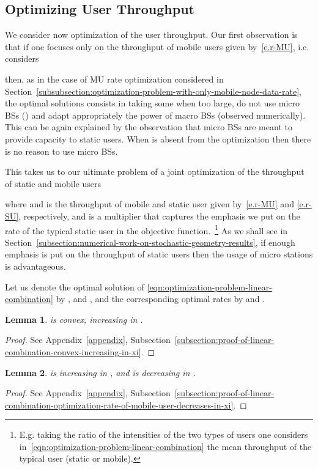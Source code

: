 \documentclass[10pt,journal]{IEEEtran}
\newtheorem{lemma}{Lemma}
\begin{document}
\subsection{Optimizing User Throughput}
\label{subsection:incorporating-data-rate-of-static-users-in-optimization}
We consider now optimization of the user throughput.
Our first observation is that if one focuses only on the throughput of
mobile users  given by~\eqref{e.r-MU}, i.e. considers 

then, as in the case of MU rate optimization considered in
Section~\ref{subsubsection:optimization-problem-with-only-mobile-node-data-rate}, 
 the optimal solutions
consists in taking some  when  too large,
do not use micro BSs () and adapt appropriately the
power of macro BSs (observed numerically). 
This can be again explained by the  observation that 
micro BSs are meant to provide capacity to static users. When 
 is absent from the optimization then there is no reason to use 
micro BSs.

 
This takes us to our ultimate problem of a joint optimization of
the throughput of static and mobile users

where  and  is the throughput of mobile and static
user given by~\eqref{e.r-MU} and \eqref{e.r-SU}, respectively, and 
 is a multiplier that  captures the emphasis we put 
on the rate of the typical static user in the objective
function.~\footnote{E.g. taking the ratio of the intensities of the
  two types of users  one
  considers in~\eqref{eqn:optimization-problem-linear-combination}
the mean throughput of the typical user (static or mobile).}
As we shall see in
Section~\ref{subsection:numerical-work-on-stochastic-geometry-results}, 
if enough emphasis is put on the throughput of static users then the
usage of micro stations is advantageous. 


Let us denote the optimal solution of \eqref{eqn:optimization-problem-linear-combination} by 
,  and , and the corresponding optimal rates by 
 and .

\begin{lemma}\label{lemma:linear-combination-convex-increasing-in-xi}
  is convex, increasing in .
\end{lemma}
\begin{proof}
 See Appendix~\ref{appendix}, 
 Subsection~\ref{subsection:proof-of-linear-combination-convex-increasing-in-xi}.
\end{proof}


\begin{lemma}\label{lemma:linear-combination-optimization-rate-of-mobile-user-decreases-in-xi}
  is increasing in , and  is decreasing in .
\end{lemma}
\begin{proof}
 See Appendix~\ref{appendix}, 
 Subsection~\ref{subsection:proof-of-linear-combination-optimization-rate-of-mobile-user-decreases-in-xi}.
\end{proof}
\end{document}
